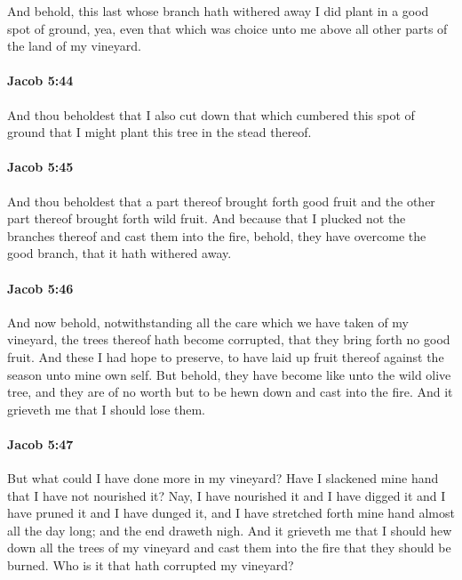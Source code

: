			And behold, this last whose branch hath withered away
			I did plant in a good spot of ground,
			yea, even that which was choice unto me
			above all other parts of the land of my vineyard.

		\paragraph{Jacob 5:44} %
			\label{JACOB-5-44}

			And thou beholdest that I also cut down
			that which cumbered this spot of ground
			that I might plant this tree in the stead thereof.

		\paragraph{Jacob 5:45} %
			\label{JACOB-5-45}

			And thou beholdest that a part thereof brought forth good fruit
			and the other part thereof brought forth wild fruit.
			And because that I plucked not the branches thereof and cast them into the fire,
			behold, they have overcome the good branch, that it hath withered away.

		\paragraph{Jacob 5:46} %
			\label{JACOB-5-46}

			And now behold, notwithstanding all the care
			which we have taken of my vineyard,
			the trees thereof hath become corrupted,
			that they bring forth no good fruit.
			And these I had hope to preserve,
			to have laid up fruit thereof against the season unto mine own self.
			But behold, they have become like unto the wild olive tree,
			and they are of no worth but to be hewn down and cast into the fire.
			And it grieveth me that I should lose them.

		\paragraph{Jacob 5:47} %
			\label{JACOB-5-47}

			But what could I have done more in my vineyard?
			Have I slackened mine hand that I have not nourished it?
			Nay, I have nourished it and I have digged it
			and I have pruned it and I have dunged it,
			and I have stretched forth mine hand almost all the day long;
			and the end draweth nigh.
			And it grieveth me that I should hew down all the trees of my vineyard
			and cast them into the fire that they should be burned.
			Who is it that hath corrupted my vineyard?

